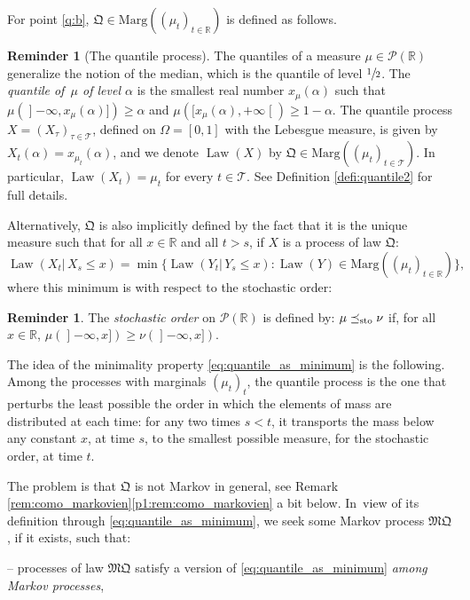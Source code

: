 \documentclass[JEP,XML,SOM,Unicode,NoEqCountersInSection,NoFloatCountersInSection,published]{cedram}
\theoremstyle{plain}
\theoremstyle{definition}
\newtheorem{reminder}[them]{Reminder}
\newcommand{\como}{\mathfrak{Q}}
\newcommand{\mq}{\mathfrak{MQ}}
\newcommand{\Tt}{{\mathcal T}}
\newcommand{\p}{\mathcal{P}}
\newcommand{\ma}{\mathrm{Marg}}
\newcommand{\R}{\mathbb{R}}
\newcommand{\law}{\operatorname{Law}}
\newcommand{\leqs}{\preceq_{\text{\rm sto}}}
\newcommand{\op}{\mathopen}
\newcommand{\clo}{\mathclose}
\begin{document}
For point \eqref{q:b}, $\como\in\ma((\mu_t)_{t\in\R})$ is defined as follows.

\begin{reminder}[The quantile process]\label{remind:quantile}The quantiles of a measure $\mu\in\p(\R)$ generalize the notion of the median, which is the quantile of level $\sfrac{1}{2}$.
The \emph{quantile of~$\mu$ of level $\alpha$} is the smallest real number $x_\mu(\alpha)$ such that $\mu(\op]-\infty,x_\mu(\alpha)])\geq \alpha$ and $\mu([x_\mu(\alpha),+\infty\clo[)\geq 1-\alpha$.
The quantile process $X=(X_\tau)_{\tau\in \Tt}$, defined on $\Omega=[0,1]$ with the Lebesgue measure, is given by $X_t(\alpha)=x_{\mu_t}(\alpha)$, and we denote $\law(X)$ by $\como\in \ma((\mu_t)_{t\in \Tt})$. In particular, $\law(X_t)=\mu_t$ for every $t\in \Tt$. See Definition \ref{defi:quantile2} for full details.
\end{reminder}

Alternatively, $\como$ is also implicitly defined by the fact that it is the unique measure such that for all $x\in\R$ and all $t>s$, if $X$ is a process of law $\como$:
\begin{equation}\label{eq:quantile_as_minimum}\law(X_{t}|\,X_{s}\leqslant x)=\min\{\law(Y_{t}|\,Y_{s}\leqslant x): \law(Y)\in\ma((\mu_t)_{t\in\R})\},
\end{equation}
where this minimum is with respect to the stochastic order:

\begin{reminder}\label{remind:sto} The \emph{stochastic order} on $\p(\R)$ is defined by: $\mu\leqs\nu$ if, for all $x\in\R$, $\mu(\op]-\infty,x])\geqslant\nu(\op]-\infty,x])$.
\end{reminder}

The idea of the minimality property \eqref{eq:quantile_as_minimum} is the following. Among the processes with marginals $(\mu_t)_t$, the quantile process is the one that perturbs the least possible the order in which the elements of mass are distributed at each time: for any two times $s<t$, it transports the mass below any constant $x$, at time $s$, to the smallest possible measure, for the stochastic order, at time $t$.

The problem is that $\como$ is not Markov in general, see Remark \ref{rem:como_markovien}\eqref{p1:rem:como_markovien} a bit below. In~view of its definition through \eqref{eq:quantile_as_minimum}, we seek some Markov process $\mq$, if it exists, such that:

-- processes of law $\mq$ satisfy a version of \eqref{eq:quantile_as_minimum} \emph{among Markov processes},
\end{document}
